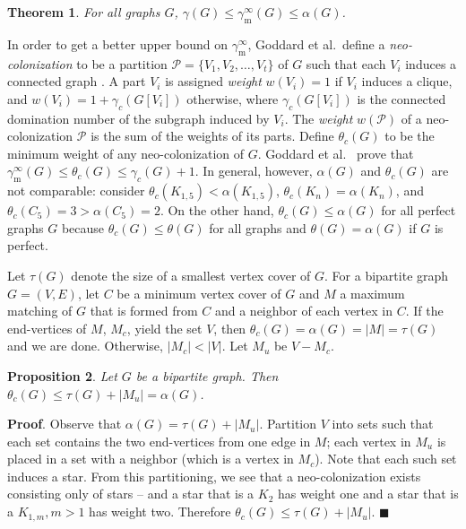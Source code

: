 \documentclass[12pt]{article}%
\newtheorem{theorem}{Theorem}[section]
\newtheorem{proposition}[theorem]{Proposition}
\begin{document}
\begin{theorem}
\label{GHH1} \emph{\cite{GHH}} For all graphs $G$, $\gamma(G)\leq
\gamma_{\mathrm{m}}^{\infty}(G)\leq\alpha(G)$.
\end{theorem}

In order to get a better upper bound on $\gamma_{\mathrm{m}}^{\infty}$,
Goddard et al.~define a \emph{neo-colonization} to be a partition
$\mathcal{P}=\{V_{1},V_{2},\ldots,V_{t}\}$ of $G$ such that each $V_{i}$
induces a connected graph \cite{GHH}. A part $V_{i}$ is assigned \emph{weight}
$w(V_{i})=1$ if $V_{i}$ induces a clique, and $w(V_{i})=1+\gamma_{c}%
(G[V_{i}])$ otherwise, where $\gamma_{c}(G[V_{i}])$ is the connected
domination number of the subgraph induced by $V_{i}$. The \emph{weight}
$w(\mathcal{P})$ of a neo-colonization $\mathcal{P}$ is the sum of the weights
of its parts. Define $\theta_{c}(G)$ to be the minimum weight of any
neo-colonization of $G$. Goddard et al.~\cite{GHH} prove that $\gamma
_{\mathrm{m}}^{\infty}(G)\leq\theta_{c}(G)\leq\gamma_{c}(G)+1$. In general,
however, $\alpha(G)$ and $\theta_{c}(G)$ are not comparable: consider
$\theta_{c}(K_{1,5})<\alpha(K_{1,5})$, $\theta_{c}(K_{n})=\alpha(K_{n})$, and
$\theta_{c}(C_{5})=3>\alpha(C_{5})=2$. On the other hand, $\theta_{c}%
(G)\leq\alpha(G)$ for all perfect graphs $G$ because $\theta_{c}(G)\leq
\theta(G)$ for all graphs and $\theta(G)=\alpha(G)$ if $G$ is perfect.

Let $\tau(G)$ denote the size of a smallest vertex cover of $G$. For a
bipartite graph $G=(V,E)$, let $C$ be a minimum vertex cover of $G$ and $M$ a
maximum matching of $G$ that is formed from $C$ and a neighbor of each vertex
in $C$. If the end-vertices of $M$, $M_{c}$, yield the set $V$, then
$\theta_{c}(G)=\alpha(G)=|M|=\tau(G)$ and we are done. Otherwise,
$|M_{c}|<|V|$. Let $M_{u}$ be $V-M_{c}$.

\begin{proposition}
Let $G$ be a bipartite graph. Then $\theta_{c}(G) \leq\tau(G) + |M_{u}| =
\alpha(G)$.
\end{proposition}

\noindent\textbf{Proof}.\hspace{0.1in} Observe that $\alpha(G) = \tau(G) +
|M_{u}|$. Partition $V$ into sets such that each set contains the two
end-vertices from one edge in $M$; each vertex in $M_{u}$ is placed in a set
with a neighbor (which is a vertex in $M_{c}$). Note that each such set
induces a star. From this partitioning, we see that a neo-colonization exists
consisting only of stars -- and a star that is a $K_{2}$ has weight one and a
star that is a $K_{1, m}, m > 1$ has weight two. Therefore $\theta_{c}(G)
\leq\tau(G) + |M_{u}|$. \hfill$\blacksquare$
\end{document}
